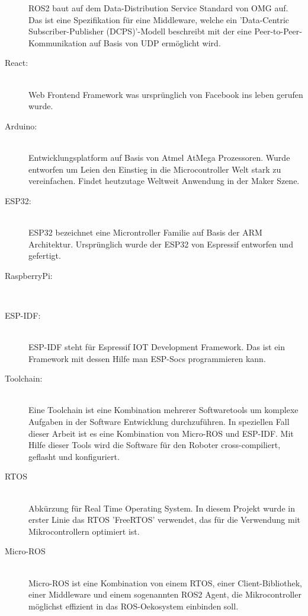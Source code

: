 \begin{flushleft}
\begin{description}
        ROS2 baut auf dem Data-Distribution Service Standard von OMG auf. 
        Das ist eine Spezifikation für eine Middleware, welche ein 'Data-Centric Subscriber-Publisher (DCPS)'-Modell beschreibt mit der eine Peer-to-Peer-Kommunikation auf Basis von UDP ermöglicht wird.


        \item[React:]\hfill\\
        Web Frontend Framework was ursprünglich von Facebook ins leben gerufen wurde.

        \item[Arduino:]\hfill\\
        Entwicklungsplatform auf Basis von Atmel AtMega Prozessoren. Wurde entworfen um Leien den Einstieg in die Microcontroller
        Welt stark zu vereinfachen. Findet heutzutage Weltweit Anwendung in der Maker Szene.

        \item[ESP32:]\hfill\\
        ESP32 bezeichnet eine Microntroller Familie auf Basis der ARM Architektur.
        Ursprünglich wurde der ESP32 von Espressif entworfen und gefertigt.

        \item[RaspberryPi:]\hfill\\
        
        \item[ESP-IDF:]\hfill\\
        ESP-IDF steht für Espressif IOT Development Framework. Das ist ein Framework mit dessen Hilfe man ESP-Socs programmieren kann. \cite{esp_idf}
        
        \item[Toolchain:] \hfill\\
        Eine Toolchain ist eine Kombination mehrerer Softwaretools um komplexe Aufgaben in der Software Entwicklung durchzuführen.
        In speziellen Fall dieser Arbeit ist es eine Kombination von Micro-ROS und ESP-IDF.
        Mit Hilfe dieser Tools wird die Software für den Roboter cross-compiliert, geflasht und konfiguriert.

        \item[RTOS]\hfill\\
        Abkürzung für Real Time Operating System. 
        In diesem Projekt wurde in erster Linie das RTOS 'FreeRTOS' verwendet, das für die Verwendung mit Mikrocontrollern optimiert ist. \cite{freertos}
        
        \item[Micro-ROS]\hfill\\
        Micro-ROS ist eine Kombination von einem RTOS, einer Client-Bibliothek, einer Middleware und einem sogenannten ROS2 Agent, 
        die Mikrocontroller möglichst effizient in das ROS-Oekosystem einbinden soll.
        

\end{description}
\end{flushleft}
